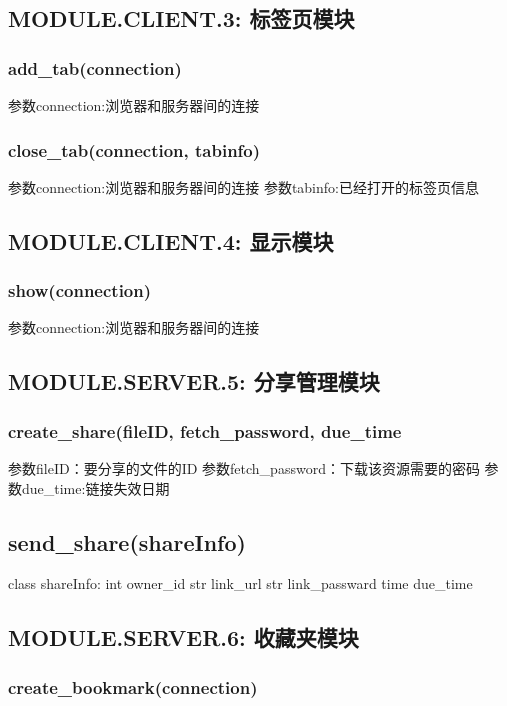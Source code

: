 \subsection{MODULE.CLIENT.3: 标签页模块}

\subsubsection{add_tab(connection)}
参数connection:浏览器和服务器间的连接
\subsubsection{close_tab(connection, tabinfo)}
参数connection:浏览器和服务器间的连接
参数tabinfo:已经打开的标签页信息

\subsection{MODULE.CLIENT.4: 显示模块}
\subsubsection{show(connection)}
参数connection:浏览器和服务器间的连接

\subsection{MODULE.SERVER.5: 分享管理模块}
\subsubsection{create_share(fileID, fetch_password, due_time}
参数fileID：要分享的文件的ID
参数fetch_password：下载该资源需要的密码
参数due_time:链接失效日期
\subsection{send_share(shareInfo)}
class shareInfo:
    int owner_id
    str link_url
    str link_passward
    time due_time

\subsection{MODULE.SERVER.6: 收藏夹模块}
\subsubsection{create_bookmark(connection)}